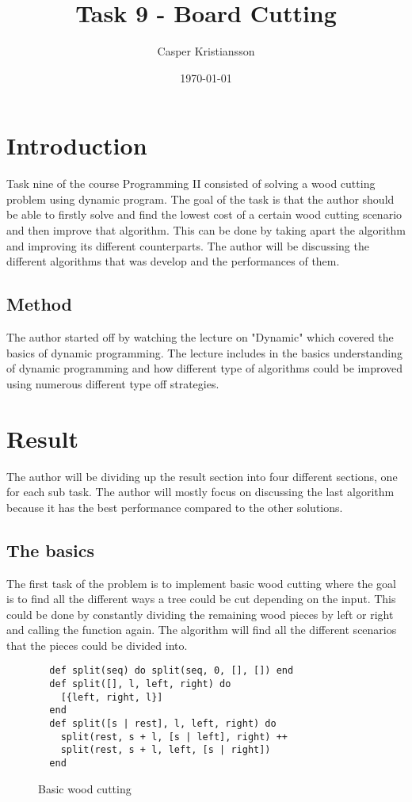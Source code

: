 \documentclass[a4paper,11pt]{article}
\begin{document}
\title{
    \textbf{Task 9 - Board Cutting}
}
\author{Casper Kristiansson}
\date{\today}

\maketitle

\section*{Introduction}
Task nine of the course Programming II consisted of solving a wood cutting problem using dynamic program. The goal of the task is that the author should be able to firstly solve and find the lowest cost of a certain wood cutting scenario and then improve that algorithm. This can be done by taking apart the algorithm and improving its different counterparts. The author will be discussing the different algorithms that was develop and the performances of them.

\subsection*{Method}
The author started off by watching the lecture on "Dynamic" which covered the basics of dynamic programming. The lecture includes in the basics understanding of dynamic programming and how different type of algorithms could be improved using numerous different type off strategies.

\section*{Result}
The author will be dividing up the result section into four different sections, one for each sub task. The author will mostly focus on discussing the last algorithm because it has the best performance compared to the other solutions.

\subsection*{The basics}
The first task of the problem is to implement basic wood cutting where the goal is to find all the different ways a tree could be cut depending on the input. This could be done by constantly dividing the remaining wood pieces by left or right and calling the function again. The algorithm will find all the different scenarios that the pieces could be divided into.

\begin{figure}[H]
\begin{verbatim}
  def split(seq) do split(seq, 0, [], []) end
  def split([], l, left, right) do
    [{left, right, l}]
  end
  def split([s | rest], l, left, right) do
    split(rest, s + l, [s | left], right) ++
    split(rest, s + l, left, [s | right])
  end
\end{verbatim}
\caption{Basic wood cutting}
\label{Figure:1}
\end{figure}
\end{document}
